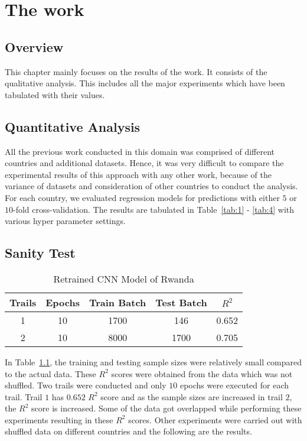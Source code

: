 \chapter{The work}
\section{Overview}
This chapter mainly focuses on the results of the work. It consists of the qualitative analysis. This includes all the major experiments which have been tabulated with their values. 

\section{Quantitative Analysis}
All the previous work conducted in this domain was comprised of different countries and additional datasets. Hence, it was very difficult to compare the experimental results of this approach with any other work, because of the variance of datasets and consideration of other countries to conduct the analysis. For each country, we evaluated regression models for predictions with either $5$ or $10$-fold cross-validation. The results are tabulated in Table~\ref{tab:1} - \ref{tab:4} with various hyper parameter settings. 


\newline
\section{Sanity Test}

\begin{table}[h!]
 \caption{Retrained CNN Model of Rwanda}
 \label{tab:3} 
\begin{center}
\begin{tabular}{|c|c|c|c|c|}
\hline
Trails & Epochs & Train Batch & Test Batch & $R^2$    \\
\hline\hline
1 & 10 & 1700 & 146 & 0.652 \\
2 & 10 & 8000 & 1700 & 0.705 \\
\hline\hline
\end{tabular}
\end{center}
\end{table}

In {Table~\ref{tab:3}},
\newline the training and testing sample sizes were relatively small compared to the actual data. These $R^2$ scores were obtained from the data which was not shuffled. Two trails were conducted and only $10$ epochs were executed for each trail. Trail $1$ has $0.652$ $R^2$ score and as the sample sizes are increased in trail $2$, the $R^2$ score is increased. Some of the data got overlapped while performing these experiments resulting in these $R^2$ scores. Other experiments were carried out with shuffled data on different countries and the following are the results.


